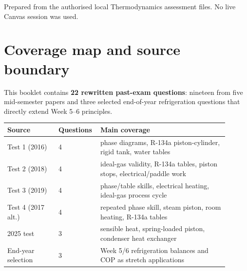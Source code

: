 \documentclass[10pt,a4paper]{article}
\begin{document}
\begin{titlepage}\centering\vspace*{25mm}{\Huge\bfseries Thermodynamics\\Past Exam Booklet\par}\vspace{5mm}{\Large Weeks 1--6 Questions and Clear Answers\par}\vspace{4mm}{\large Mid-semester papers plus selected end-of-year applications\par}\vfill
{}
\vfill{\small Prepared from the authorised local Thermodynamics assessment files. No live Canvas session was used.\par}\end{titlepage}
\tableofcontents\clearpage

\section{Coverage map and source boundary}
This booklet contains \textbf{22 rewritten past-exam questions}: nineteen from five mid-semester papers and three selected end-of-year refrigeration questions that directly extend Week 5--6 principles.

\begin{center}
\begin{tabular}{p{0.22\linewidth}p{0.13\linewidth}p{0.55\linewidth}}
\toprule
Source & Questions & Main coverage\\\midrule
Test 1 (2016) & 4 & phase diagrams, R-134a piston-cylinder, rigid tank, water tables\\
Test 2 (2018) & 4 & ideal-gas validity, R-134a tables, piston stops, electrical/paddle work\\
Test 3 (2019) & 4 & phase/table skills, electrical heating, ideal-gas process cycle\\
Test 4 (2017 alt.) & 4 & repeated phase skill, steam piston, room heating, R-134a tables\\
2025 test & 3 & sensible heat, spring-loaded piston, condenser heat exchanger\\
End-year selection & 3 & Week 5/6 refrigeration balances and COP as stretch applications\\\bottomrule
\end{tabular}
\end{center}
\end{document}
